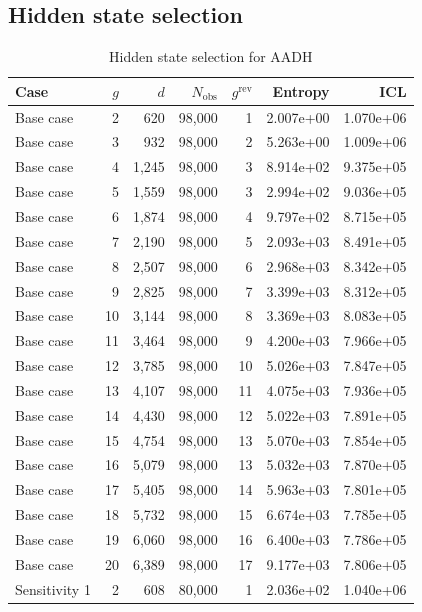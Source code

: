 \subsection{Hidden state selection}
\begin{table}
 \centering
 \caption{Hidden state selection for AADH}
 \begin{tabular}{lrrrrrr}
 \toprule
  Case & $g$ & $d$ & $N_{\mathrm{obs}}$ & $g^{\mathrm{rev}}$ & Entropy & ICL \\
 \midrule
  Base case & 2 & 620 &  98,000 &   1 & 2.007e+00 & 1.070e+06 \\
  Base case & 3 & 932 &  98,000 &   2 & 5.263e+00 & 1.009e+06 \\
  Base case & 4 & 1,245 &  98,000 &   3 & 8.914e+02 & 9.375e+05 \\
  Base case & 5 & 1,559 &  98,000 &   3 & 2.994e+02 & 9.036e+05 \\
  Base case & 6 & 1,874 &  98,000 &   4 & 9.797e+02 & 8.715e+05 \\
  Base case & 7 & 2,190 &  98,000 &   5 & 2.093e+03 & 8.491e+05 \\
  Base case & 8 & 2,507 &  98,000 &   6 & 2.968e+03 & 8.342e+05 \\
  Base case & 9 & 2,825 &  98,000 &   7 & 3.399e+03 & 8.312e+05 \\
  Base case & 10 & 3,144 &  98,000 &   8 & 3.369e+03 & 8.083e+05 \\
  Base case & 11 & 3,464 &  98,000 &   9 & 4.200e+03 & 7.966e+05 \\
  Base case & 12 & 3,785 &  98,000 &   10 & 5.026e+03 & 7.847e+05 \\
  Base case & 13 & 4,107 &  98,000 &   11 & 4.075e+03 & 7.936e+05 \\
  Base case & 14 & 4,430 &  98,000 &   12 & 5.022e+03 & 7.891e+05 \\
  Base case & 15 & 4,754 &  98,000 &   13 & 5.070e+03 & 7.854e+05 \\
  Base case & 16 & 5,079 &  98,000 &   13 & 5.032e+03 & 7.870e+05 \\
  Base case & 17 & 5,405 &  98,000 &   14 & 5.963e+03 & 7.801e+05 \\
  Base case & 18 & 5,732 &  98,000 &   15 & 6.674e+03 & 7.785e+05 \\
  Base case & 19 & 6,060 &  98,000 &   16 & 6.400e+03 & 7.786e+05 \\
  Base case & 20 & 6,389 &  98,000 &   17 & 9.177e+03 & 7.806e+05 \\
 Sensitivity 1 & 2 & 608 &  80,000 &   1 & 2.036e+02 & 1.040e+06 \\

\end{tabular}
\end{table}
